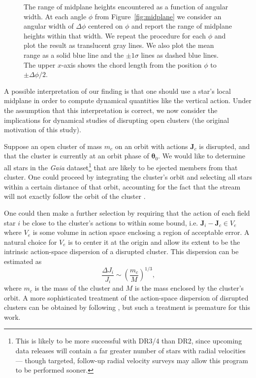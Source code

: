 \documentclass[twocolumn]{aastex62}
\newcommand{\beq}{\begin{equation}}
\newcommand{\eeq}{\end{equation}}
\begin{document}
\begin{figure*}
\caption{The range of midplane heights encountered as a function of angular
width. At each angle $\phi$ from Figure~\ref{fig:midplane} we consider an
angular width of $\Delta \phi$ centered on $\phi$ and report the range of
midplane heights within that width. We repeat the procedure for each $\phi$
and plot the result as translucent gray lines. We also plot the mean range as
a solid blue line and the $\pm1\sigma$ lines as dashed blue lines. The upper
$x$-axis shows the chord length from the position $\phi$ to
$\pm\Delta\phi/2$.}
\label{fig:range_deltaphi}
\end{figure*}

A possible interpretation of our finding is that one should use a star's local
midplane in order to compute dynamical quantities like the vertical action.
Under the assumption that this interpretation is correct, we now consider the
implications for dynamical studies of disrupting open clusters (the original
motivation of this study).

Suppose an open cluster of mass $m_c$ on an orbit with actions $\bm{J}_c$ is
disrupted, and that the cluster is currently at an orbit phase of
$\bm{\theta}_0$. We would like to determine all stars in the {\em Gaia}
dataset\footnote{This is likely to be more successful with DR3/4 than DR2,
since upcoming data releases will contain a far greater number of stars with
radial velocities --- though targeted, follow-up radial velocity surveys may
allow this program to be performed sooner.} that are likely to be ejected
members from that cluster. One could proceed by integrating the cluster's
orbit and selecting all stars within a certain distance of that orbit,
accounting for the fact that the stream will not exactly follow the orbit of
the cluster \citep[e.g.][]{2011MNRAS.413.1852E}.

One could then make a further selection by requiring that the action of each
field star $i$ be close to the cluster's actions to within some bound, i.e.
$\bm{J}_i - \bm{J}_c \in V_e$ where $V_e$ is some volume in action space
enclosing a region of acceptable error. A natural choice for $V_e$ is to
center it at the origin and allow its extent to be the intrinsic action-space
dispersion of a disrupted cluster. This dispersion can be estimated as
\citep[\S~8.3.3][]{2008gady.book.....B}
\beq \label{eq:action_disp}
\frac{\Delta J_i}{J_i} \sim \left(\frac{m_c}{M}\right)^{1/3}\text{,}
\eeq
where $m_c$ is the mass of the cluster and $M$ is the mass enclosed by the
cluster's orbit. A more sophisticated treatment of the action-space dispersion
of disrupted clusters can be obtained by following
\citet{2011MNRAS.413.1852E}, but such a treatment is premature for this work.
\end{document}
